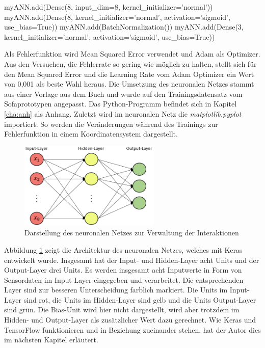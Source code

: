 \begin{python}
myANN.add(Dense(8, input_dim=8, 
                kernel_initializer='normal'))
myANN.add(Dense(8, kernel_initializer='normal', 
                activation='sigmoid', use_bias=True))
myANN.add(BatchNormalization())
myANN.add(Dense(3, kernel_initializer='normal', 
                activation='sigmoid', use_bias=True))
\end{python}
Als Fehlerfunktion wird Mean Squared Error verwendet und Adam als Optimizer. Aus den Versuchen, die Fehlerrate so gering wie möglich zu halten, stellt sich für den Mean Squared Error und die Learning Rate vom Adam Optimizer ein Wert von 0,001 als beste Wahl heraus. Die Umsetzung des neuronalen Netzes stammt aus einer Vorlage aus dem Buch \citep{frochte2018} und wurde auf den Trainingsdatensatz vom Sofaprototypen angepasst. Das Python-Programm befindet sich in Kapitel \ref{cha:anh} als Anhang. Zuletzt wird im neuronalen Netz die \emph{matplotlib.pyplot} importiert. So werden die Veränderungen während des Trainings zur Fehlerfunktion in einem Koordinatensystem dargestellt.
\newline
\begin{figure}[H]
	\centering
		\includegraphics[width=0.6\textwidth]{images/NN.png}
	\caption{Darstellung des neuronalen Netzes zur Verwaltung der Interaktionen}
	\label{fig:NN}
\end{figure}
\newline
Abbildung \ref{fig:NN} zeigt die Architektur des neuronalen Netzes, welches mit Keras entwickelt wurde. Insgesamt hat der Input- und Hidden-Layer acht Units und der Output-Layer drei Units. Es werden insgesamt acht Inputwerte in Form von Sensordaten im Input-Layer eingegeben und verarbeitet. Die entsprechenden Layer sind zur besseren Unterscheidung farblich markiert. Die Units im Input-Layer sind rot, die Units im Hidden-Layer sind gelb und die Units Output-Layer sind grün. Die Bias-Unit wird hier nicht dargestellt, wird aber trotzdem im Hidden- und Output-Layer als zusätzlicher Wert dazu gerechnet. Wie Keras und TensorFlow funktionieren und in Beziehung zueinander stehen, hat der Autor dies im nächsten Kapitel erläutert.


